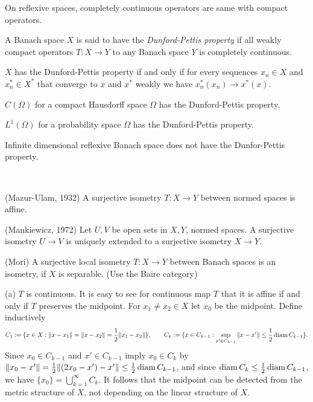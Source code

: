 \documentclass{../../large}
\begin{document}
\begin{prb}
On reflexive spaces, completely continuous operators are same with compact operators.
\end{prb}


\begin{prb}
A Banach space $X$ is said to have the \emph{Dunford-Pettis property} if all weakly compact operators $T:X\to Y$ to any Banach space $Y$ is completely continuous.
\begin{parts}
\item $X$ has the Dunford-Pettis property if and only if for every sequences $x_n\in X$ and $x^*_n\in X^*$ that converge to $x$ and $x^*$ weakly we have $x^*_n(x_n)\to x^*(x)$.
\item $C(\Omega)$ for a compact Hausdorff space $\Omega$ has the Dunford-Pettis property.
\item $L^1(\Omega)$ for a probability space $\Omega$ has the Dunford-Pettis property.
\item Infinite dimensional reflexive Banach space does not have the Dunfor-Pettis property.
\end{parts}
\end{prb}


\begin{prb}\,
\begin{parts}
\item (Mazur-Ulam, 1932) A surjective isometry $T:X\to Y$ between normed spaces is affine.
\item (Mankiewicz, 1972) Let $U,V$ be open sets in $X,Y$, normed spaces. A surjective isometry $U\to V$ is uniquely extended to a surjective isometry $X\to Y$.
\item (Mori) A surjective local isometry $T:X\to Y$ between Banach spaces is an isometry, if $X$ is separable. (Use the Baire category)
\end{parts}
\end{prb}
\begin{sol}
(a)
$T$ is continuous.
It is easy to see for continuous map $T$ that it is affine if and only if $T$ preserves the midpoint.
For $x_1\ne x_2\in X$ let $x_0$ be the midpoint.
Define inductively
\[C_1:=\{x\in X:\|x-x_1\|=\|x-x_2\|=\frac12\|x_1-x_2\|\},\qquad C_k:=\{x\in C_{k-1}:\sup_{x'\in C_{k-1}}\|x-x'\|\le\frac12\operatorname{diam} C_{k-1}\}.\]
Since $x_0\in C_{k-1}$ and $x'\in C_{k-1}$ imply $x_0\in C_k$ by $\|x_0-x'\|=\frac12\|(2x_0-x')-x'\|\le\frac12\operatorname{diam} C_{k-1}$, and since $\operatorname{diam} C_k\le\frac12\operatorname{diam} C_{k-1}$, we have $\{x_0\}=\bigcup_{k=1}^\infty C_k$.
It follows that the midpoint can be detected from the metric structure of $X$, not depending on the linear structure of $X$.
\end{sol}
\end{document}
